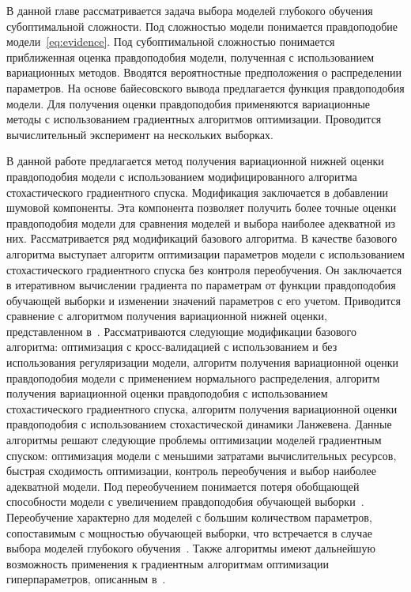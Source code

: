 В данной главе рассматривается задача выбора моделей глубокого обучения субоптимальной сложности. Под сложностью модели понимается правдоподобие модели~\eqref{eq:evidence}. Под субоптимальной сложностью понимается приближенная оценка правдоподобия модели, полученная с использованием вариационных методов. Вводятся вероятностные предположения о распределении параметров. На основе байесовского вывода предлагается функция правдоподобия модели. Для получения оценки правдоподобия применяются вариационные методы с использованием градиентных алгоритмов оптимизации. Проводится вычислительный эксперимент на нескольких выборках.

В данной работе предлагается метод получения вариационной нижней оценки  правдоподобия модели с использованием модифицированного алгоритма стохастического градиентного спуска. {Модификация заключается в добавлении шумовой компоненты. Эта компонента позволяет получить более точные оценки правдоподобия модели для сравнения моделей и выбора наиболее адекватной из них. } Рассматривается ряд модификаций базового алгоритма. {В качестве базового алгоритма выступает алгоритм оптимизации параметров модели с использованием стохастического градиентного спуска без контроля переобучения. Он заключается в итеративном вычислении градиента по параметрам от функции правдоподобия обучающей выборки и изменении значений параметров с его учетом.} Приводится сравнение с алгоритмом получения вариационной нижней оценки, представленном в~\cite{nips}. {Рассматриваются следующие модификации базового алгоритма:
оптимизация с кросс-валидацией с использованием и без использования регуляризации модели,
алгоритм получения вариационной оценки правдоподобия модели с применением нормального распределения,
алгоритм получения вариационной оценки правдоподобия с использованием стохастического градиентного спуска,
алгоритм получения вариационной оценки правдоподобия с использованием стохастической динамики Ланжевена.}
 { Данные алгоритмы решают следующие проблемы оптимизации моделей  градиентным спуском: оптимизация модели с меньшими затратами вычислительных ресурсов, быстрая сходимость оптимизации, контроль переобучения и выбор наиболее адекватной модели.
Под переобучением понимается потеря обобщающей способности модели с увеличением правдоподобия обучающей выборки~\cite{MacKay}. Переобучение характерно для моделей с большим количеством параметров, сопоставимым с мощностью обучающей выборки, что встречается в случае выбора моделей глубокого обучения~\cite{hinton_rbm, suts}.
}
Также алгоритмы имеют дальнейшую возможность применения к градиентным алгоритмам оптимизации гиперпараметров, описанным в~\cite{hyper}.

